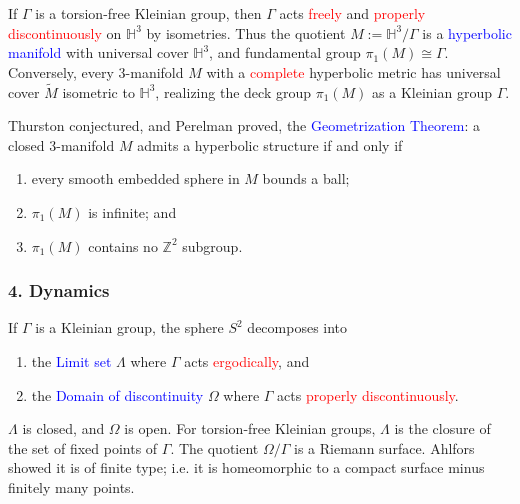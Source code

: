 \documentclass{beamer}
\def\Z{\mathbb{Z}}
\def\H{\mathbb{H}}
\begin{document}
\frame
{
If $\Gamma$ is a torsion-free Kleinian group, then
$\Gamma$ acts \textcolor{red}{freely} and \textcolor{red}{properly discontinuously}
on $\H^3$ by isometries.
\vskip 10pt
Thus the quotient $M:=\H^3/\Gamma$ is a \textcolor{blue}{hyperbolic manifold}
with universal cover $\H^3$, and fundamental group $\pi_1(M)\cong \Gamma$.
\vskip 10pt
Conversely, every 3-manifold $M$ with a \textcolor{red}{complete} hyperbolic
metric has universal cover $\widetilde{M}$ isometric to $\H^3$, realizing
the deck group $\pi_1(M)$ as a Kleinian group $\Gamma$.
}
\frame
{
Thurston conjectured, and Perelman proved, the 
\vskip 10pt
\textcolor{blue}{Geometrization Theorem}: a closed 3-manifold $M$ admits a hyperbolic structure if and only if
\begin{enumerate}
\item{every smooth embedded sphere in $M$ bounds a ball;}
\item{$\pi_1(M)$ is infinite; and}
\item{$\pi_1(M)$ contains no $\Z^2$ subgroup.}
\end{enumerate}
}
\frame
{
\frametitle{4. Dynamics}
If $\Gamma$ is a Kleinian group, the sphere $S^2$ decomposes into 
\begin{enumerate}
\item{the \textcolor{blue}{Limit set} 
$\Lambda$ where $\Gamma$ acts \textcolor{red}{ergodically}, and}
\item{the \textcolor{blue}{Domain of discontinuity}
$\Omega$ where $\Gamma$ acts \textcolor{red}{properly discontinuously}.}
\end{enumerate}
$\Lambda$ is closed, and $\Omega$ is open. For torsion-free 
Kleinian groups, $\Lambda$ is the closure of the set of fixed points of $\Gamma$.
\vskip 10pt
The quotient $\Omega/\Gamma$ is a Riemann surface. Ahlfors showed it is of
\textcolor{dgreen}{finite type}; i.e.\/ it is homeomorphic to a compact surface
minus finitely many points.
}
\frame
\end{document}

